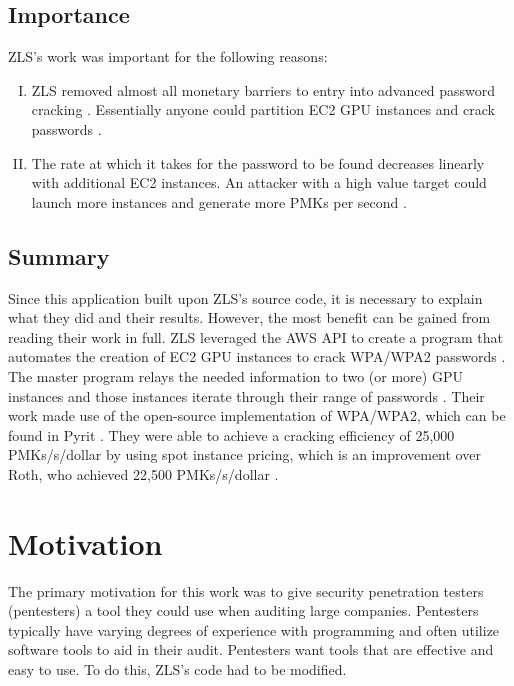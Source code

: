 \documentclass[12pt]{article}
\begin{document}
\subsection{Importance}
ZLS's work was important for the following reasons:
\begin{enumerate}[(I)]
\item ZLS removed almost all monetary barriers to entry into advanced password cracking \cite{cck}. Essentially anyone could partition EC2 GPU instances and crack passwords \cite{cck}.
\item The rate at which it takes for the password to be found decreases linearly with additional EC2 instances. An attacker with a high value target could launch more instances and generate more PMKs per second \cite{cck}.
\end{enumerate}
\subsection{Summary}
Since this application built upon ZLS's source code, it is necessary to explain what they did and their results. However, the most benefit can be gained from reading their work in full. ZLS leveraged the AWS API to create a program that automates the creation of EC2 GPU instances to crack WPA/WPA2 passwords \cite{cck}. The master program relays the needed information to two (or more) GPU instances and those instances iterate through their range of passwords \cite{cck}. Their work made use of the open-source implementation of WPA/WPA2, which can be found in Pyrit \cite{cck,pyrit}. They were able to achieve a cracking efficiency of 25,000 PMKs/s/dollar by using spot instance pricing, which is an improvement over Roth, who achieved 22,500 PMKs/s/dollar \cite{cck,roth}.

\section{Motivation}
\indent The primary motivation for this work was to give security penetration testers (pentesters) a tool they could use when auditing large companies. Pentesters typically have varying degrees of experience with programming and often utilize software tools to aid in their audit. Pentesters want tools that are effective and easy to use. To do this, ZLS's code had to be modified.
\end{document}
